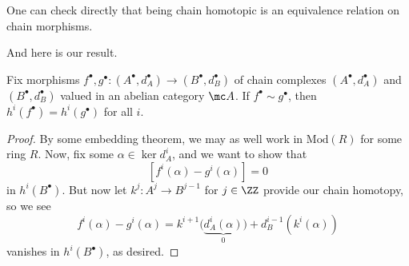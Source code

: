 \documentclass[../notes.tex]{subfiles}
\begin{document}
\begin{remark}
	One can check directly that being chain homotopic is an equivalence relation on chain morphisms.
\end{remark}
And here is our result.
\begin{proposition} \label{prop:chain-homotopy-on-cohom}
	Fix morphisms $f^\bullet,g^\bullet\colon(A^\bullet,d_A^\bullet)\to(B^\bullet,d_B^\bullet)$ of chain complexes $(A^\bullet,d_A^\bullet)$ and $(B^\bullet,d_B^\bullet)$ valued in an abelian category $\mc A$. If $f^\bullet\sim g^\bullet$, then $h^i(f^\bullet)=h^i(g^\bullet)$ for all $i$.
\end{proposition}
\begin{proof}
	By some embedding theorem, we may as well work in $\mathrm{Mod}(R)$ for some ring $R$. Now, fix some $\alpha\in\ker d_A^i$, and we want to show that
	\[\left[f^i(\alpha)-g^i(\alpha)\right]=0\]
	in $h^i(B^\bullet)$. But now let $k^j\colon A^j\to B^{j-1}$ for $j\in\ZZ$ provide our chain homotopy, so we see
	\[f^i(\alpha)-g^i(\alpha)=k^{i+1}\big(\underbrace{d_A^i(\alpha)}_0\big)+d_B^{i-1}\left(k^i(\alpha)\right)\]
	vanishes in $h^i(B^\bullet)$, as desired.
\end{proof}
\end{document}
